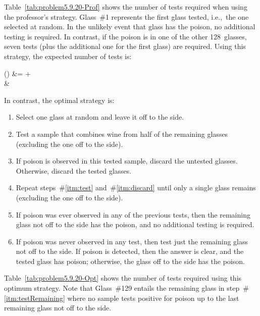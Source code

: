 Table~\ref{tab:problem5.9.20-Prof} shows the number of tests required when using the professor's strategy.  Glass~\#1 represents the first glass tested, i.e.,~the one selected at random.  In the unlikely event that glass has the poison, no additional testing is required. In contrast, if the poison is in one of the other 128~glasses, seven tests (plus the additional one for the first glass) are required.  Using this strategy, the expected number of tests is:

\begin{aligncustom}
  () &=   +   \\
                                          &\approx {}
\end{aligncustom}


In contrast, the optimal strategy is:
\vspace{-1.25em}
\begin{enumerate}[leftmargin=1.35cm]
  \setlength\itemsep{0em}
  \item Select one glass at random and leave it off to the side.
  \item\label{itm:test} Test a sample that combines wine from half of the remaining glasses (excluding the one off to the side).
  \item\label{itm:discard} If poison is observed in this tested sample, discard the untested glasses.  Otherwise, discard the tested glasses.
  \item Repeat steps~\#\ref{itm:test} and~\#\ref{itm:discard} until only a single glass remains (excluding the one off to the side).
  \item If poison was ever observed in any of the previous tests, then the remaining glass not off to the side has the poison, and no additional testing is required.
  \item\label{itm:testRemaining} If poison was never observed in any test, then test just the remaining glass not off to the side. If poison is detected, then the answer is clear, and the tested glass has poison; otherwise, the glass off to the side has the poison.
\end{enumerate}

Table~\ref{tab:problem5.9.20-Opt} shows the number of tests required using this optimum strategy.    Note that Glass~\#129 entails the remaining glass in step~\#\ref{itm:testRemaining} where no sample tests positive for poison up to the last remaining glass not off to the side.

